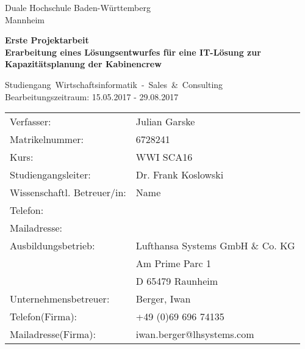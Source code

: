 \documentclass [12pt, a4paper, oneside, titlepage, ngerman]{article}
\begin{document}
\begin{titlepage}
\Large
\begin{minipage}{\textwidth} \centering \Large
     Duale Hochschule Baden-Württemberg \\  
     Mannheim 
\end{minipage} \vspace{1cm}

\begin{minipage}{\textwidth} \centering \Large
     \textbf{Erste Projektarbeit \\ Erarbeitung eines Lösungsentwurfes für eine IT-Lösung zur Kapazitätsplanung der Kabinencrew}
\end{minipage} \vspace{1cm}

\begin{minipage}{\textwidth} \centering \Large
     \mbox{Studiengang Wirtschaftsinformatik - Sales \& Consulting}\\  \large Bearbeitungszeitraum: 15.05.2017 - 29.08.2017
\end{minipage} \vspace{1cm}


\begin{table}[h!]
  \begin{tabular}{ll}
Verfasser: & Julian Garske \\
Matrikelnummer: & 6728241 \vspace{0.5cm} \\ 
Kurs: & WWI SCA16 \\
 Studiengangsleiter:& Dr. Frank Koslowski \vspace{0.5cm} \\
Wissenschaftl. Betreuer/in: &Name \\ 
Telefon:& \\ 
Mailadresse:& \vspace{0.5cm}\\
Ausbildungsbetrieb: &Lufthansa Systems GmbH \& Co. KG \\ 
& Am Prime Parc 1 \\ 
& D 65479 Raunheim \vspace{0.5cm}\\
Unternehmensbetreuer: &Berger, Iwan \\ 
Telefon(Firma): &+49 (0)69 696 74135 \\
 Mailadresse(Firma):& iwan.berger@lhsystems.com \\
  \end{tabular}
\end{table}



\end{titlepage}
\end{document}
